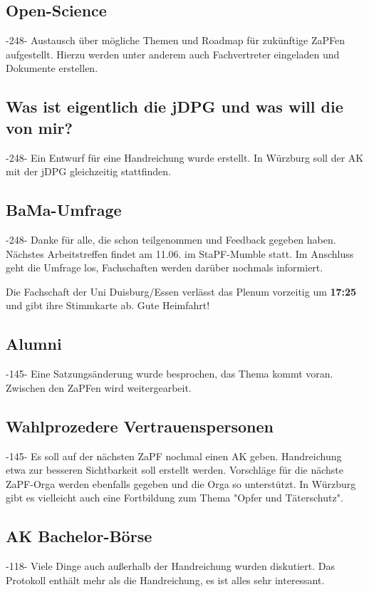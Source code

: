   \subsection{Open-Science}
    -248- Austausch über mögliche Themen und Roadmap für zukünftige ZaPFen aufgestellt. Hierzu werden unter anderem auch Fachvertreter eingeladen und Dokumente erstellen.

  \subsection{Was ist eigentlich die jDPG und was will die von mir?}
    -248- Ein Entwurf für eine Handreichung wurde erstellt. In Würzburg soll der AK mit der jDPG gleichzeitig stattfinden.

  \subsection{BaMa-Umfrage}
    -248- Danke für alle, die schon teilgenommen und Feedback gegeben haben.
    Nächstes Arbeitstreffen findet am 11.06. im StaPF-Mumble statt.
    Im Anschluss geht die Umfrage los, Fachschaften werden darüber nochmals informiert.

  \begin{info}{}
    Die Fachschaft der Uni Duisburg/Essen verlässt das Plenum vorzeitig um \textbf{17:25} und gibt ihre Stimmkarte ab. Gute Heimfahrt!
  \end{info}

  \subsection{Alumni}
    -145- Eine Satzungsänderung wurde besprochen, das Thema kommt voran. Zwischen den ZaPFen wird weitergearbeit.

  \subsection{Wahlprozedere Vertrauenspersonen}
    -145- Es soll auf der nächsten ZaPF nochmal einen AK geben.
    Handreichung etwa zur besseren Sichtbarkeit soll erstellt werden.
    Vorschläge für die nächste ZaPF-Orga werden ebenfalls gegeben und die Orga so unterstützt.
    In Würzburg gibt es vielleicht auch eine Fortbildung zum Thema "Opfer und Täterschutz".

  \subsection{AK Bachelor-Börse}
    -118- Viele Dinge auch außerhalb der Handreichung wurden diskutiert.
    Das Protokoll enthält mehr als die Handreichung, es ist alles sehr interessant.

